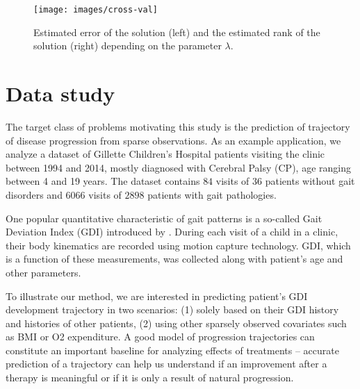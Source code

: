 \documentclass[preprint]{imsart}
\numberwithin{equation}{section}
\theoremstyle{plain}
\begin{document}
\begin{figure}[h!]
  \texttt{[image: images/cross-val]}
  \caption{Estimated error of the solution (left) and the estimated rank of the solution (right) depending on the parameter $\lambda$.}
  \label{fig:estimated-rank}
\end{figure}



\section{Data study}

The target class of problems motivating this study is the prediction of trajectory of disease progression from sparse observations. As an example application, we analyze a dataset of Gillette Children's Hospital patients visiting the clinic between 1994 and 2014, mostly diagnosed with Cerebral Palsy (CP), age ranging between 4 and 19 years. The dataset contains $84$ visits of $36$ patients without gait disorders and $6066$ visits of $2898$ patients with gait pathologies. 

One popular quantitative characteristic of gait patterns is a so-called Gait Deviation Index (GDI) introduced by \citet{schwartz2008gait}. During each visit of a child in a clinic, their body kinematics are recorded using motion capture technology. GDI, which is a function of these measurements, was collected along with patient's age and other parameters.

To illustrate our method, we are interested in predicting patient's GDI development trajectory in two scenarios: (1) solely based on their GDI history and histories of other patients, (2) using other sparsely observed covariates such as BMI or O2 expenditure. A good model of progression trajectories can constitute an important baseline for analyzing effects of treatments -- accurate prediction of a trajectory can help us understand if an improvement after a therapy is meaningful or if it is only a result of natural progression.
\end{document}
